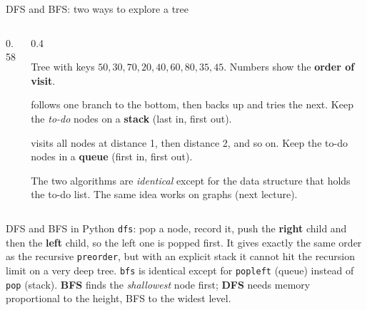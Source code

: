 \documentclass[aspectratio=169,10pt]{beamer}
\newcommand{\fA}{white}\newcommand{\fB}{white}\newcommand{\fC}{white}\newcommand{\fD}{white}
\newcommand{\fE}{white}\newcommand{\fF}{white}\newcommand{\fG}{white}
\newcommand{\wideshape}[9]{%
  \node[tn,fill=\fA] (a) at (0,0) {#1};
  \node[tn,fill=\fB] (b) at (-2.6,-1.1) {#2};  \node[tn,fill=\fC] (c) at (2.6,-1.1) {#3};
  \node[tn,fill=\fD] (d) at (-3.9,-2.2) {#4};  \node[tn,fill=\fE] (e) at (-1.3,-2.2) {#5};
  \node[tn,fill=\fF] (f) at (1.3,-2.2) {#6};   \node[tn,fill=\fG] (g) at (3.9,-2.2) {#7};
  \node[tn,fill=\fH] (h) at (-2.2,-3.3) {#8};  \node[tn,fill=\fI] (i) at (-0.4,-3.3) {#9};
  \foreach \p/\q in {a/b,a/c,b/d,b/e,c/f,c/g,e/h,e/i}{\draw[tdInk!60] (\p) -- (\q);}}
\newcommand{\fH}{white}\newcommand{\fI}{white}
\begin{document}
\begin{frame}{DFS and BFS: two ways to explore a tree}
\begin{columns}[T]
\begin{column}{0.58\textwidth}
\begin{sfig}[0.78]
\end{sfig}
\end{column}
\begin{column}{0.4\textwidth}
{\small
Tree with keys $50,30,70,20,40,60,80,35,45$. Numbers show the \textbf{order of visit}.

\vspace{2mm}
 follows one branch to the bottom, then backs up and tries the next. Keep the \emph{to-do} nodes on a \textbf{stack} (last in, first out).

\vspace{2mm}
 visits all nodes at distance 1, then distance 2, and so on. Keep the to-do nodes in a \textbf{queue} (first in, first out).

\vspace{2mm}
The two algorithms are \emph{identical} except for the data structure that holds the to-do list. The same idea works on graphs (next lecture).}
\end{column}
\end{columns}
\end{frame}

\begin{frame}[allowframebreaks]{DFS and BFS in Python}
\vspace{2mm}
{\small
\texttt{dfs}: pop a node, record it, push the \textbf{right} child and then the \textbf{left} child, so the left one is popped first. It gives exactly the same order as the recursive \texttt{preorder}, but with an explicit stack it cannot hit the recursion limit on a very deep tree.}
\framebreak
{}
\vspace{2mm}
\vspace{2mm}
{\small
\texttt{bfs} is identical except for \texttt{popleft} (queue) instead of \texttt{pop} (stack).
\textbf{BFS} finds the \emph{shallowest} node first; \textbf{DFS} needs memory proportional to the height, BFS to the widest level.}
\end{frame}
\end{document}
